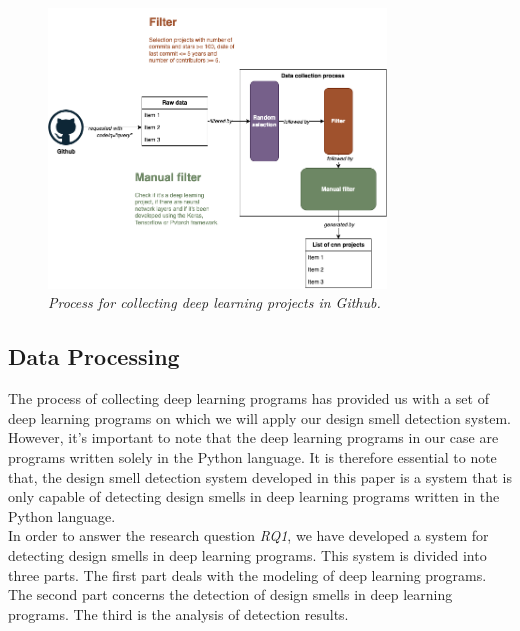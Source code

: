 \begin{figure}[h]
  \centering
  \includegraphics[width=0.8\textwidth]{figure/design_smell_data_collection.png}
  \caption{\emph{Process for collecting deep learning projects in Github.}}
  \label{fig:data_collect}
\end{figure}






\subsection{Data Processing}
\label{sec:DataProcessing}
The process of collecting deep learning programs has provided us with a set of deep learning programs on which we will apply our design smell detection system. However, it's important to note that the deep learning programs in our case are programs written solely in the Python language. It is therefore essential to note that, the design smell detection system developed in this paper is a system that is only capable of detecting design smells in deep learning programs written in the Python language.\\

In order to answer the research question \emph{RQ1}, we have developed a system for detecting design smells in deep learning programs. This system is divided into three parts. The first part deals with the modeling of deep learning programs. The second part concerns the detection of design smells in deep learning programs. The third is the analysis of detection results.\\

